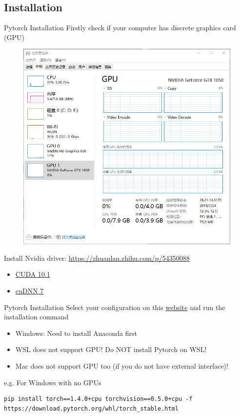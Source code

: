 \documentclass{../TexTemplate/myslide}
\begin{document}
\subsection{Installation}
\begin{frame}{Pytorch Installation}
Firstly check if your computer has discrete graphics card (GPU)
\begin{figure}
\centering
\includegraphics[width=0.45\linewidth]{fig/gpu-monitor.png}
\end{figure}
Install Nvidia driver: \url{https://zhuanlan.zhihu.com/p/54350088}
\begin{itemize}
	\item \href{https://developer.nvidia.com/cuda-10.1-download-archive-base}{CUDA 10.1}
	\item \href{https://developer.nvidia.com/cudnn}{cuDNN 7}
\end{itemize}
\end{frame}

\begin{frame}[fragile]{Pytorch Installation}
Select your configuration on this \href{https://pytorch.org/}{website} and run the installation command
\begin{itemize}
	\item Windows: Need to install Anaconda first
	\item WSL does not support GPU! Do NOT install Pytorch on WSL!
	\item Mac does not support GPU too (if you do not have external interface)!
\end{itemize}
e.g. For Windows with no GPUs
\begin{lstlisting}
pip install torch==1.4.0+cpu torchvision==0.5.0+cpu -f https://download.pytorch.org/whl/torch_stable.html
\end{lstlisting}
\end{frame}
\end{document}
